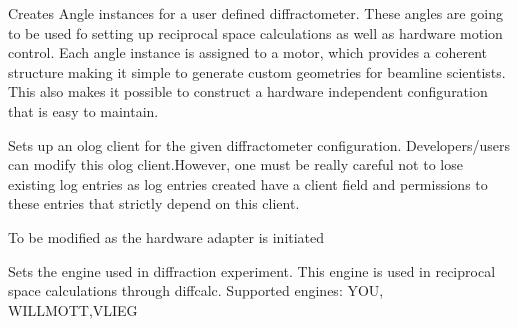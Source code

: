 \documentclass[letterpaper,10pt,english]{sphinxmanual}
\begin{document}
\begin{fulllineitems}
\begin{fulllineitems}
\end{fulllineitems}


\begin{fulllineitems}
\label{Developer Manual:Diffractometer.Diffractometer.setAnglesforHardware}
Creates Angle instances for a user defined diffractometer. These angles are going to be used fo setting up 
reciprocal space calculations as well as hardware motion control. 
Each angle instance is assigned to a motor, which provides a coherent structure making it simple to generate 
custom geometries for beamline scientists. This also makes it possible to construct a hardware independent
configuration that is easy to maintain.

\end{fulllineitems}


\begin{fulllineitems}
\label{Developer Manual:Diffractometer.Diffractometer.setClient}
Sets up an olog client for the given diffractometer configuration. Developers/users can modify this olog client.However, one must be really careful not to lose existing log entries as log entries created have a client field and permissions to these entries that strictly depend on this client.

\end{fulllineitems}


\begin{fulllineitems}
\label{Developer Manual:Diffractometer.Diffractometer.setDCInstance}
To be modified as the hardware adapter is initiated

\end{fulllineitems}


\begin{fulllineitems}
\label{Developer Manual:Diffractometer.Diffractometer.setEngine}
Sets the engine used in diffraction experiment. This engine is used in reciprocal space
calculations through diffcalc. 
Supported engines: YOU, WILLMOTT,VLIEG


\end{fulllineitems}
\end{fulllineitems}
\end{document}
